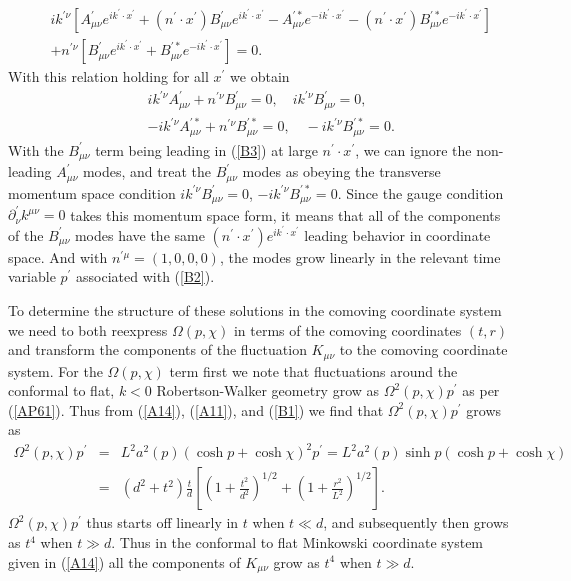 %
\begin{eqnarray}
&&ik^{\prime \nu}\left[A^{\prime}_{\mu\nu}e^{ik^{\prime}\cdot x^{\prime}}+(n^{\prime}\cdot x^{\prime})B^{\prime}_{\mu\nu}e^{ik^{\prime}\cdot x^{\prime}}-A^{\prime *}_{\mu\nu}e^{-ik^{\prime}\cdot x^{\prime}}-(n^{\prime}\cdot x^{\prime})B^{\prime *}_{\mu\nu}e^{-ik^{\prime}\cdot x^{\prime}}\right]
\nonumber\\
&&+n^{\prime\nu}\left[B^{\prime}_{\mu\nu}e^{ik^{\prime}\cdot x^{\prime}}+B^{\prime *}_{\mu\nu}e^{-ik^{\prime}\cdot x^{\prime}}\right]=0.
\label{B4}
\end{eqnarray}
%
With this relation holding for all $x^{\prime}$ we obtain
%
\begin{eqnarray}
&&ik^{\prime \nu}A^{\prime}_{\mu\nu}+n^{ \prime\nu}B^{\prime}_{\mu\nu}=0,\quad ik^{\prime \nu}B^{\prime}_{\mu\nu}=0, 
\nonumber\\
&&
-ik^{\prime \nu}A^{\prime *}_{\mu\nu}+n^{ \prime\nu}B^{\prime *}_{\mu\nu}=0,\quad -ik^{\prime \nu}B^{\prime *}_{\mu\nu}=0.
\label{B5}
\end{eqnarray}
%
With the $B^{\prime}_{\mu\nu}$ term being leading in (\ref{B3}) at large $n^{\prime}\cdot x^{\prime}$, we can ignore the non-leading $A^{\prime}_{\mu\nu}$ modes, and treat the $B^{\prime}_{\mu\nu}$ modes as obeying the transverse momentum space condition  $ik^{\prime \nu}B^{\prime}_{\mu\nu}=0$, $-ik^{\prime \nu}B^{\prime *}_{\mu\nu}=0$. Since the gauge condition $\partial^{\prime}_{\nu}k^{\mu\nu}=0$ takes this momentum space form, it means that all of the components of the $B^{\prime}_{\mu\nu}$ modes have the same $(n^{\prime}\cdot x^{\prime})e^{ik^{\prime}\cdot x^{\prime}}$ leading behavior in coordinate space. And with $n^{\prime \mu}=(1,0,0,0)$, the modes grow linearly in the relevant time variable $p^{\prime}$ associated with (\ref{B2}).

To determine the structure of these solutions in the comoving coordinate system we need to both reexpress $\Omega(p,\chi)$ in terms of the comoving coordinates $(t,r)$ and transform the components of the fluctuation $K_{\mu\nu}$ to the comoving coordinate system. For the $\Omega(p,\chi)$ term first  we note that fluctuations around the conformal to flat, $k<0$ Robertson-Walker geometry grow as $\Omega^2(p,\chi)p^{\prime}$ as per (\ref{AP61}). Thus  from (\ref{A14}), (\ref{A11}), and (\ref{B1}) we find that $\Omega^2(p,\chi)p^{\prime}$ grows as
%
\begin{eqnarray}
\Omega^2(p,\chi)p^{\prime}&=&L^2a^2(p)(\cosh p+\cosh \chi)^2p^{\prime}=L^2a^2(p)\sinh p (\cosh p+\cosh \chi)
\nonumber\\
&=&(d^2+t^2)\frac{t}{d}\left[\left(1+\frac{t^2}{d^2}\right)^{1/2}+\left(1+\frac{r^2}{L^2}\right)^{1/2}\right].
\label{B6}
\end{eqnarray}
%
$\Omega^2(p,\chi)p^{\prime}$ thus starts off linearly in $t$ when $t\ll d$, and subsequently then grows as $t^4$ when $t\gg d$. Thus in the conformal to flat Minkowski coordinate system given in (\ref{A14}) all the components of $K_{\mu\nu}$ grow as $t^4$ when $t \gg d$.

